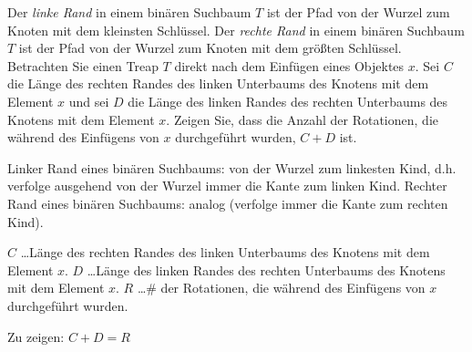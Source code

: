\documentclass{article}
\begin{document}
Der {\it linke Rand} in einem bin{\"a}ren Suchbaum $T$ ist der Pfad von der Wurzel
zum Knoten mit dem kleinsten Schl{\"u}ssel. Der {\it rechte Rand} in einem
bin{\"a}ren Suchbaum $T$ ist der Pfad von der Wurzel zum Knoten mit dem
gr{\"o}{\ss}ten Schl{\"u}ssel. Betrachten Sie einen Treap $T$ direkt nach dem
Einf{\"u}gen eines Objektes $x$. Sei $C$ die L{\"a}nge des rechten Randes des
linken Unterbaums des Knotens mit dem Element $x$ und sei $D$ die L{\"a}nge des
linken Randes des rechten Unterbaums des Knotens mit dem Element $x$. Zeigen Sie,
dass die Anzahl der Rotationen, die w{\"a}hrend des Einf{\"u}gens von $x$
durchgef{\"u}hrt wurden, $C + D$ ist.

\medskip%

Linker Rand eines bin{\"a}ren Suchbaums: von der Wurzel zum linkesten Kind, d.h.
verfolge ausgehend von der Wurzel immer die Kante zum linken Kind.
\newline
Rechter Rand eines bin{\"a}ren Suchbaums: analog (verfolge immer die Kante zum
rechten Kind).

$C$ \ldots L{\"a}nge des rechten Randes des linken Unterbaums des Knotens mit dem
Element $x$.
\newline
$D$ \ldots L{\"a}nge des linken Randes des rechten Unterbaums des Knotens mit dem
Element $x$.
\newline
$R$ \ldots \# der Rotationen, die w{\"a}hrend des Einf{\"u}gens von $x$
durchgef{\"u}hrt wurden.


Zu zeigen: $C + D = R$
\end{document}
